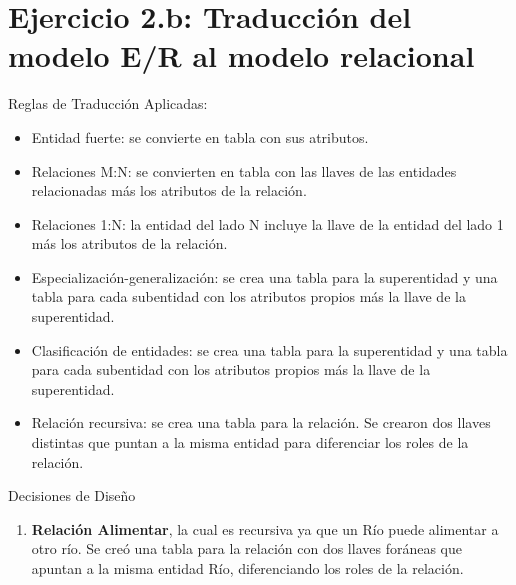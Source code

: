 
\section{Ejercicio 2.b: Traducción del modelo E/R al modelo relacional}

Reglas de Traducción Aplicadas:
\begin{itemize}
    \item Entidad fuerte: se convierte en tabla con sus atributos.
    \item Relaciones M:N: se convierten en tabla con las llaves de las entidades relacionadas más los atributos de la relación.
    \item Relaciones 1:N: la entidad del lado N incluye la llave de la entidad del lado 1 más los atributos de la relación.
    \item Especialización-generalización: se crea una tabla para la superentidad y una tabla para cada subentidad con los atributos propios más la llave de la superentidad.
    \item Clasificación de entidades: se crea una tabla para la superentidad y una tabla para cada subentidad con los atributos propios más la llave de la superentidad.
    \item Relación recursiva: se crea una tabla para la relación. Se crearon dos llaves distintas que puntan a la misma entidad para diferenciar los roles de la relación.
\end{itemize}

Decisiones de Diseño
\begin{enumerate}
    \item \textbf{Relación Alimentar}, la cual es recursiva ya que un Río puede alimentar a otro río. Se creó una tabla para la relación con dos llaves foráneas que apuntan a la misma entidad Río, diferenciando los roles de la relación.
\end{enumerate}
